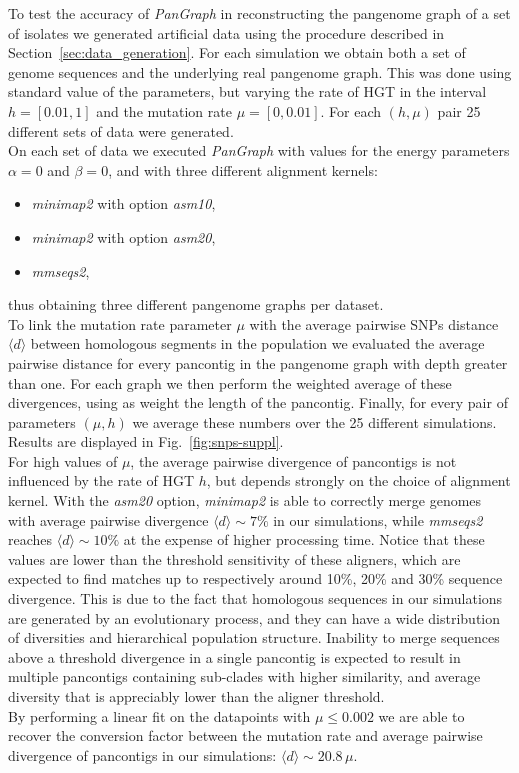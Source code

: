 \documentclass[aps,rmp,reprint,superscriptaddress,notitlepage,10pt,onecolumn]{revtex4-1}
\newcommand{\avg}[1]{\langle #1 \rangle}
\begin{document}
To test the accuracy of \textit{PanGraph} in reconstructing the pangenome graph of a set of isolates we generated artificial data using the procedure described in Section~\ref{sec:data_generation}. For each simulation we obtain both a set of genome sequences and the underlying real pangenome graph. This was done using standard value of the parameters, but varying the rate of HGT in the interval $h=[0.01,1]$ and the mutation rate $\mu=[0,0.01]$. For each $(h,\mu)$ pair 25 different sets of data were generated.\\
On each set of data we executed \textit{PanGraph} with values for the energy parameters $\alpha=0$ and $\beta=0$, and with three different alignment kernels:
\begin{itemize}
    \itemsep0pt
    \item \textit{minimap2} with option \textit{asm10},
    \item \textit{minimap2} with option \textit{asm20},
    \item \textit{mmseqs2},
\end{itemize}
thus obtaining three different pangenome graphs per dataset.\\
To link the mutation rate parameter $\mu$ with the average pairwise SNPs distance $\avg{d}$ between homologous segments in the population we evaluated the average pairwise distance for every pancontig in the pangenome graph with depth greater than one. For each graph we then perform the weighted average of these divergences, using as weight the length of the pancontig. Finally, for every pair of parameters $(\mu,h)$ we average these numbers over the 25 different simulations. Results are displayed in Fig.~\ref{fig:snps-suppl}.\\
For high values of $\mu$, the average pairwise divergence of pancontigs is not influenced by the rate of HGT $h$, but depends strongly on the choice of alignment kernel. With the \textit{asm20} option, \textit{minimap2} is able to correctly merge genomes with average pairwise divergence $\avg{d} \sim 7\%$ in our simulations, while \textit{mmseqs2} reaches $\avg{d} \sim 10\%$ at the expense of higher processing time. Notice that these values are lower than the threshold sensitivity of these aligners, which are expected to find matches up to respectively around 10\%, 20\% and 30\% sequence divergence. This is due to the fact that homologous sequences in our simulations are generated by an evolutionary process, and they can have a wide distribution of diversities and hierarchical population structure. Inability to merge sequences above a threshold divergence in a single pancontig is expected to result in multiple pancontigs containing sub-clades with higher similarity, and average diversity that is appreciably lower than the aligner threshold.\\
By performing a linear fit on the datapoints with $\mu \leq 0.002$ we are able to recover the conversion factor between the mutation rate and average pairwise divergence of pancontigs in our simulations: $\avg{d} \sim 20.8 \, \mu$.
\end{document}
